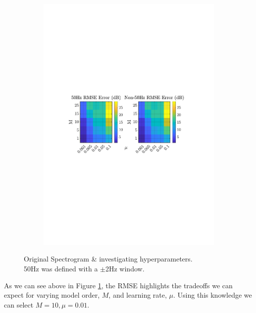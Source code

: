 \documentclass[12pt]{article}
\begin{document}
\begin{figure}[H]
\begin{subfigure}{0.49\textwidth}
					\includegraphics[trim={2.8cm 11.2cm 3.00cm  11.2cm}, clip, width=\textwidth]{../MATLAB/figures/q2_3d_fig06.pdf} 
					\captionsetup{justification=centering}
				\end{subfigure}
				
				\captionsetup{justification=centering}
				\caption{ Original Spectrogram \& investigating hyperparameters. \\
						  50Hz was defined with a $\pm$2Hz window. }
				\label{fig: 2-3d-orig+paramSweep}
			\end{figure}
		
			As we can see above in Figure \ref{fig: 2-3d-orig+paramSweep}, the RMSE highlights the
			tradeoffs we can expect for varying model order, $M$, and learning rate, $\mu$. Using 
			this knowledge we can select $M=10,\mu=0.01$. 
			
\end{document}
